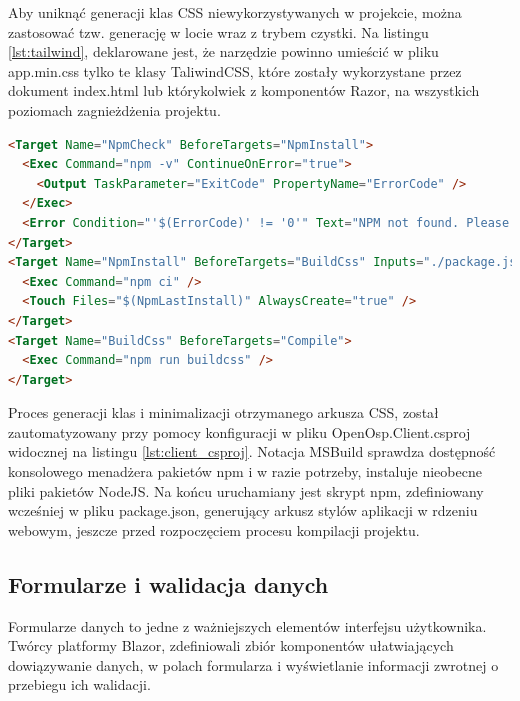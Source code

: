 Aby uniknąć generacji klas CSS niewykorzystywanych w projekcie, można zastosować tzw. generację w locie wraz z trybem czystki. Na listingu \ref{lst:tailwind}, deklarowane jest, że narzędzie powinno umieścić w pliku app.min.css tylko te klasy TaliwindCSS, które zostały wykorzystane przez dokument index.html lub którykolwiek z komponentów Razor, na wszystkich poziomach zagnieżdżenia projektu.

\begin{lstlisting}[language=HTML, caption={Fragment pliku OpenOsp.Client.csproj, automatyzujący generację arkusza CSS projektu}, label=lst:client_csproj]
<Target Name="NpmCheck" BeforeTargets="NpmInstall">
  <Exec Command="npm -v" ContinueOnError="true">
    <Output TaskParameter="ExitCode" PropertyName="ErrorCode" />
  </Exec>
  <Error Condition="'$(ErrorCode)' != '0'" Text="NPM not found. Please install Node.js and npm first." />
</Target>
<Target Name="NpmInstall" BeforeTargets="BuildCss" Inputs="./package.json" Outputs="$(NpmLastInstall)">
  <Exec Command="npm ci" />
  <Touch Files="$(NpmLastInstall)" AlwaysCreate="true" />
</Target>
<Target Name="BuildCss" BeforeTargets="Compile">
  <Exec Command="npm run buildcss" />
</Target>
\end{lstlisting}

Proces generacji klas i minimalizacji otrzymanego arkusza CSS, został zautomatyzowany przy pomocy konfiguracji w pliku OpenOsp.Client.csproj widocznej na listingu \ref{lst:client_csproj}. Notacja MSBuild sprawdza dostępność konsolowego menadżera pakietów npm i w razie potrzeby, instaluje nieobecne pliki pakietów NodeJS. Na końcu uruchamiany jest skrypt npm, zdefiniowany wcześniej w pliku package.json, generujący arkusz stylów aplikacji w rdzeniu webowym, jeszcze przed rozpoczęciem procesu kompilacji projektu.

\subsection{Formularze i walidacja danych}

Formularze danych to jedne z ważniejszych elementów interfejsu użytkownika. Twórcy platformy Blazor, zdefiniowali zbiór komponentów ułatwiających dowiązywanie danych, w polach formularza i wyświetlanie informacji zwrotnej o przebiegu ich walidacji.

